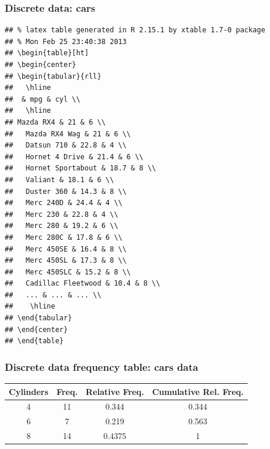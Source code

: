 \documentclass[handout]{beamer}\usepackage{graphicx, color}
\makeatletter
\newenvironment{kframe}{%
 \def\at@end@of@kframe{}%
 \ifinner\ifhmode%
  \def\at@end@of@kframe{\end{minipage}}%
  \begin{minipage}{\columnwidth}%
 \fi\fi%
 \def\FrameCommand##1{\hskip\@totalleftmargin \hskip-\fboxsep
 \colorbox{shadecolor}{##1}\hskip-\fboxsep
     \hskip-\linewidth \hskip-\@totalleftmargin \hskip\columnwidth}%
 \MakeFramed {\advance\hsize-\width
   \@totalleftmargin\z@ \linewidth\hsize
   \@setminipage}}%
 {\par\unskip\endMakeFramed%
 \at@end@of@kframe}
\newenvironment{knitrout}{}{} %
\numberwithin{equation}{section}
\makeatother
\begin{document}
\begin{frame}[fragile]
\frametitle{Discrete data: cars} \scriptsize
\begin{knitrout}
\color{fgcolor}\begin{kframe}
\begin{verbatim}
## % latex table generated in R 2.15.1 by xtable 1.7-0 package
## % Mon Feb 25 23:40:38 2013
## \begin{table}[ht]
## \begin{center}
## \begin{tabular}{rll}
##   \hline
##  & mpg & cyl \\ 
##   \hline
## Mazda RX4 & 21 & 6 \\ 
##   Mazda RX4 Wag & 21 & 6 \\ 
##   Datsun 710 & 22.8 & 4 \\ 
##   Hornet 4 Drive & 21.4 & 6 \\ 
##   Hornet Sportabout & 18.7 & 8 \\ 
##   Valiant & 18.1 & 6 \\ 
##   Duster 360 & 14.3 & 8 \\ 
##   Merc 240D & 24.4 & 4 \\ 
##   Merc 230 & 22.8 & 4 \\ 
##   Merc 280 & 19.2 & 6 \\ 
##   Merc 280C & 17.8 & 6 \\ 
##   Merc 450SE & 16.4 & 8 \\ 
##   Merc 450SL & 17.3 & 8 \\ 
##   Merc 450SLC & 15.2 & 8 \\ 
##   Cadillac Fleetwood & 10.4 & 8 \\ 
##   ... & ... & ... \\ 
##    \hline
## \end{tabular}
## \end{center}
## \end{table}
\end{verbatim}
\end{kframe}
\end{knitrout}

\end{frame}


\begin{frame}
\frametitle{Discrete data frequency table: cars data}

\begin{tabular}{|c|c|c|c|}
\hline
Cylinders & Freq. & Relative Freq. & Cumulative Rel. Freq.\\ \hline
4 & 11 & 0.344 & 0.344 \\ \hline
6 & 7 & 0.219 & 0.563 \\ \hline
8 & 14 & 0.4375 & 1\\ \hline
\end{tabular}
\end{frame}
\end{document}
